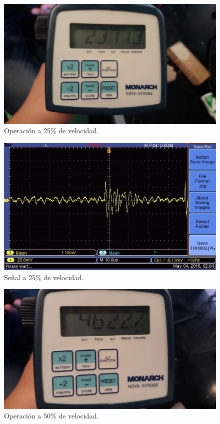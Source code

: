  \begin{figure}[!htbp]
 \centering
 \includegraphics [scale=0.2]
 {./img/2311.jpg}
  \caption{Operaci\'on a 25\% de velocidad.}
 \end{figure}

  \begin{figure}[!htbp]
 \centering
 \includegraphics [scale=0.25]
 {./img/tek0003.jpg}
  \caption{Se\~nal a 25\% de velocidad.}
 \end{figure}

  \begin{figure}[!htbp]
 \centering
 \includegraphics [scale=0.2]
 {./img/4622.jpg}
  \caption{Operaci\'on a 50\% de velocidad.}
 \end{figure}

